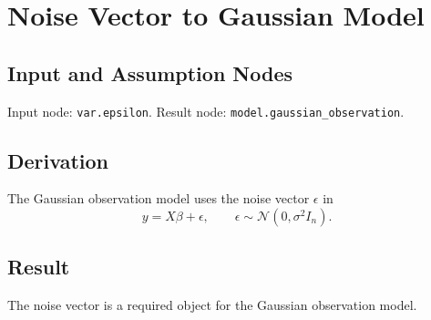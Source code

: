 \section{Noise Vector to Gaussian Model}
\label{edge:epsilon-to-gaussian-model}

\subsection{Input and Assumption Nodes}
Input node: \texttt{var.epsilon}. Result node: \texttt{model.gaussian\_observation}.

\subsection{Derivation}
The Gaussian observation model uses the noise vector \(\epsilon\) in
\[
  y = X\beta + \epsilon,
  \qquad
  \epsilon \sim \mathcal{N}(0,\sigma^2 I_n).
\]

\subsection{Result}
The noise vector is a required object for the Gaussian observation model.
